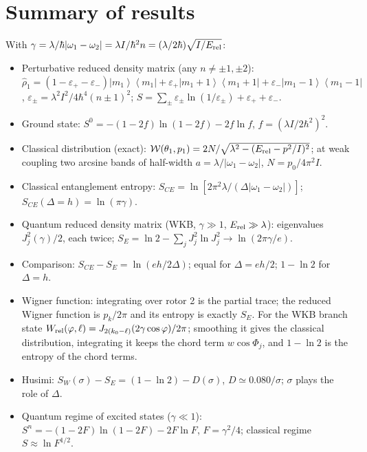 \documentclass[aps,pra,onecolumn,notitlepage,nofootinbib,11pt]{revtex4-2}
\newcommand{\ketbra}[2]{\left|#1\right\rangle\!\left\langle#2\right|}
\newcommand{\Erel}{E_{\rm rel}}
\newcommand{\epsp}{\varepsilon_{+}}
\newcommand{\epsm}{\varepsilon_{-}}
\newcommand{\Wc}{\mathcal{W}}
\begin{document}
\section{Summary of results}

With $\gamma=\lambda/\hbar|\omega_{1}-\omega_{2}|=\lambda I/\hbar^{2}n=(\lambda/2\hbar)\sqrt{I/\Erel}$:
\begin{itemize}
\item Perturbative reduced density matrix (any $n\neq\pm1,\pm2$):
$\hat\rho_{1}=(1-\epsp-\epsm)\ketbra{m_{1}}{m_{1}}+\epsp\ketbra{m_{1}+1}{m_{1}+1}
+\epsm\ketbra{m_{1}-1}{m_{1}-1}$, $\varepsilon_{\pm}=\lambda^{2}I^{2}/4\hbar^{4}(n\pm1)^{2}$;
$S=\sum_{\pm}\varepsilon_{\pm}\ln(1/\varepsilon_{\pm})+\epsp+\epsm$.
\item Ground state: $S^{0}=-(1-2f)\ln(1-2f)-2f\ln f$, $f=(\lambda I/2\hbar^{2})^{2}$.
\item Classical distribution (exact): $\Wc(\theta_{1},p_{1})=2N/\sqrt{\lambda^{2}-(\Erel-p^{2}/I)^{2}}$;
at weak coupling two arcsine bands of half-width $a=\lambda/|\omega_{1}-\omega_{2}|$,
$N=p_{0}/4\pi^{2}I$.
\item Classical entanglement entropy: $S_{CE}=\ln[2\pi^{2}\lambda/(\Delta|\omega_{1}-\omega_{2}|)]$;
$S_{CE}(\Delta=h)=\ln(\pi\gamma)$.
\item Quantum reduced density matrix (WKB, $\gamma\gg1$, $\Erel\gg\lambda$): eigenvalues
$J_{j}^{2}(\gamma)/2$, each twice; $S_{E}=\ln2-\sum_{j}J_{j}^{2}\ln J_{j}^{2}\to\ln(2\pi\gamma/e)$.
\item Comparison: $S_{CE}-S_{E}=\ln(eh/2\Delta)$; equal for $\Delta=eh/2$; $1-\ln2$ for
$\Delta=h$.
\item Wigner function: integrating over rotor 2 is the partial trace; the reduced Wigner
function is $p_{k}/2\pi$ and its entropy is exactly $S_{E}$. For the WKB branch state
$W_{\rm rel}(\varphi,\ell)=J_{2(k_{0}-\ell)}(2\gamma\cos\varphi)/2\pi$; smoothing it gives the classical
distribution, integrating it keeps the chord term $w\cos\Phi_{j}$, and $1-\ln2$ is the entropy
of the chord terms.
\item Husimi: $S_{W}(\sigma)-S_{E}=(1-\ln2)-D(\sigma)$, $D\simeq0.080/\sigma$; $\sigma$ plays the role of
$\Delta$.
\item Quantum regime of excited states ($\gamma\ll1$):
$S^{n}=-(1-2F)\ln(1-2F)-2F\ln F$, $F=\gamma^{2}/4$; classical regime $S\approx\ln F^{1/2}$.
\end{itemize}
\end{document}
